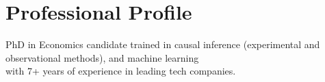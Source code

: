 \documentclass[letterpaper,11pt]{article}
\makeatletter
\newcommand{\highlightstyle}{\relax} %
\newcommand{\hl}[1]{\highlightstyle{#1}}
\newcommand{\resumeSubheading}[4]{
  \vspace{0pt}\item
    \begin{tabular*}{0.97\textwidth}[t]{l@{\extracolsep{\fill}}r}
      \textbf{#1} & #2 \\
      \small#3 & \small#4 \\
    \end{tabular*}\vspace{-5pt}
}
\newcommand{\resumeSubHeadingListStart}{\begin{itemize}[leftmargin=0.15in, label={}]}
\newcommand{\resumeSubHeadingListEnd}{\end{itemize}}
\makeatother
\begin{document}
\section{Professional Profile}
  PhD in Economics candidate trained in causal inference (experimental and observational methods), and machine learning\\ with 7+ years of experience in leading tech companies.
  
\end{document}
